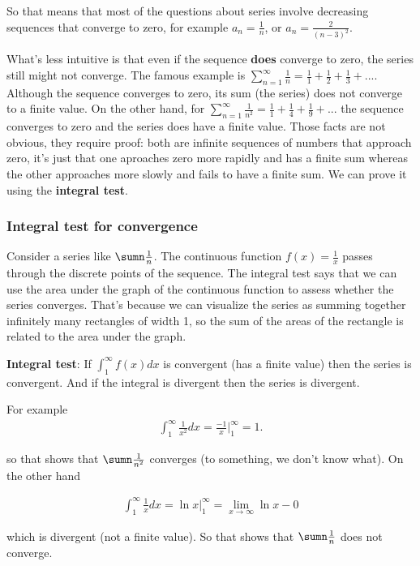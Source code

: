 So that means that most of the questions about series involve decreasing sequences that converge to zero, for example $a_n = \frac{1}{n}$, or $a_n = \frac{2}{(n-3)^2}$.

What's less intuitive is that even if the sequence \textbf{does} converge to zero, the series still might not converge. The famous example is $\sum_{n=1}^\infty \frac{1}{n} = \frac{1}{1} + \frac{1}{2} + \frac{1}{3} + ...$. Although the sequence converges to zero, its sum (the series) does not converge to a finite value. On the other hand, for $\sum_{n=1}^\infty \frac{1}{n^2} = \frac{1}{1} + \frac{1}{4} + \frac{1}{9} + ...$ the sequence converges to zero and the series does have a finite value. Those facts are not obvious, they require proof: both are infinite sequences of numbers that approach zero, it's just that one aproaches zero more rapidly and has a finite sum whereas the other approaches more slowly and fails to have a finite sum. We can prove it using the \textbf{integral test}.

\subsubsection{Integral test for convergence}
Consider a series like $\sumn \frac{1}{n}$. The continuous function $f(x) = \frac{1}{x}$ passes through the discrete points of the sequence. The integral test says that we can use the area under the graph of the continuous function to assess whether the series converges. That's because we can visualize the series as summing together infinitely many rectangles of width 1, so the sum of the areas of the rectangle is related to the area under the graph.

\textbf{Integral test}: If $\int_1^\infty f(x) dx$ is convergent (has a finite value) then the series is convergent. And if the integral is divergent then the series is divergent.

For example
\begin{align*}
  \int_1^\infty \frac{1}{x^2} dx = \frac{-1}{x} \Big|_1^\infty = 1.
\end{align*}

so that shows that $\sumn \frac{1}{n^2}$ converges (to something, we don't know what). On the other hand

\begin{align*}
  \int_1^\infty \frac{1}{x} dx = \ln x \Big|_1^\infty = \lim_{x \to \infty} \ln x - 0
\end{align*}

which is divergent (not a finite value). So that shows that $\sumn \frac{1}{n}$ does not converge.

